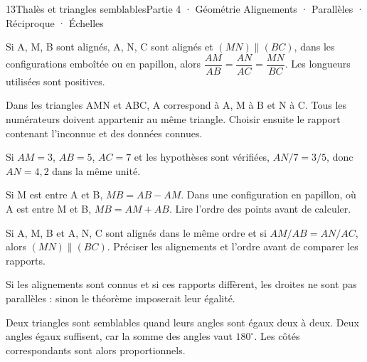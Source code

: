 \begin{ouverture}[geometrie]{13}{Thalès et triangles semblables}{Partie 4 · Géométrie}
{Alignements · Parallèles · Réciproque · Échelles}
\end{ouverture}
\pagestyle{otMain}\essentiel\fontsize{11}{15}\selectfont
{}
\begin{propriete}Si A, M, B sont alignés, A, N, C sont alignés et $(MN)\parallel(BC)$, dans les configurations emboîtée ou en papillon, alors $\dfrac{AM}{AB}=\dfrac{AN}{AC}=\dfrac{MN}{BC}$. Les longueurs utilisées sont positives.\end{propriete}
\begin{savoirfaire}Dans les triangles AMN et ABC, A correspond à A, M à B et N à C. Tous les numérateurs doivent appartenir au même triangle. Choisir ensuite le rapport contenant l’inconnue et des données connues.\end{savoirfaire}
\begin{exemple}Si $AM=3$, $AB=5$, $AC=7$ et les hypothèses sont vérifiées, $AN/7=3/5$, donc $AN=4{,}2$ dans la même unité.\end{exemple}
\begin{attention}Si M est entre A et B, $MB=AB-AM$. Dans une configuration en papillon, où A est entre M et B, $MB=AM+AB$. Lire l’ordre des points avant de calculer.\end{attention}
\clearpage
{}
\begin{propriete}Si A, M, B et A, N, C sont alignés dans le même ordre et si $AM/AB=AN/AC$, alors $(MN)\parallel(BC)$. Préciser les alignements et l’ordre avant de comparer les rapports.\end{propriete}
\begin{propriete}Si les alignements sont connus et si ces rapports diffèrent, les droites ne sont pas parallèles : sinon le théorème imposerait leur égalité.\end{propriete}
\begin{definition}Deux triangles sont semblables quand leurs angles sont égaux deux à deux. Deux angles égaux suffisent, car la somme des angles vaut $180^\circ$. Les côtés correspondants sont alors proportionnels.\end{definition}
